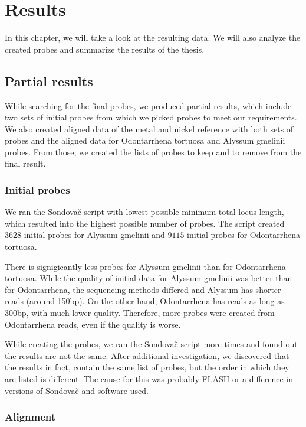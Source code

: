 \chapter[Results]{Results}
\label{kap:results}

In this chapter, we will take a look at the resulting data. We will also analyze the created probes and summarize the results of the thesis.  


\section{Partial results}

While searching for the final probes, we produced partial results, which include two sets of initial probes from which we picked probes to meet our requirements. 
We also created aligned data of the metal and nickel reference with both sets of probes and the aligned data for Odontarrhena tortuosa and Alyssum gmelinii probes. 
From those, we created the lists of probes to keep and to remove from the final result. 

\subsection{Initial probes}
We ran the Sondovač script with lowest possible minimum total locus length, which resulted into the highest possible number of probes. 
The script created $3628$ initial probes for Alyssum gmelinii and $9115$ initial probes for Odontarrhena tortuosa. 

There is signigicantly less probes for Alyssum gmelinii than for Odontarrhena tortuosa. While the quality of initial data for Alyssum gmelinii was better than for Odontarrhena, 
the sequencing methods differed and Alyssum has shorter reads (around 150bp). On the other hand, Odontarrhena has reads as long as 300bp, with much lower quality. Therefore, more 
probes were created from Odontarrhena reads, even if the quality is worse.  

While creating the probes, we ran the Sondovač script more times and found out the results are not the same. After additional investigation, we discovered that 
the results in fact, contain the same list of probes, but the order in which they are listed is different. The cause for this was probably FLASH or a difference in 
versions of Sondovač and software used. 


\subsection{Alignment}

